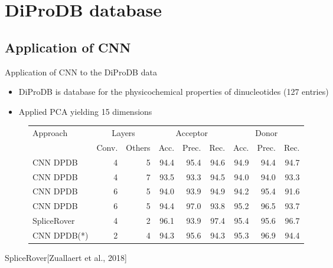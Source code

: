 \documentclass[10pt]{beamer}
\begin{document}
\section{DiProDB database}

\subsection{Application of CNN}
\begin{frame}{Application of CNN to the DiProDB data}
	\begin{itemize}
		\item DiProDB is database for the physicochemical properties of dinucleotides (127 entries)
		\item Applied PCA yielding 15 dimensions
	\end{itemize}
	\pause
	\begin{figure}
		\small
		\centering
		\begingroup
		\def\arraystretch{1.2}
		\begin{tabular}{|l|r|r|r|r|r|r|r|r|}
			\hline
			Approach  & \multicolumn{2}{c}{Layers} & \multicolumn{3}{|c|}{Acceptor} & \multicolumn{3}{c|}{Donor} \\
			\cline{2-9}
			&Conv. & Others & Acc. & Prec. & Rec. & Acc. & Prec. & Rec. \\
			\hline
			CNN DPDB & 4 & 5 & 94.4 & 95.4 & 94.6 & 94.9 & 94.4 & 94.7 \\
			CNN DPDB & 4 & 7 & 93.5 & 93.3 & 94.5 & 94.0 & 94.0 & 93.3 \\
			CNN DPDB & 6 & 5 & 94.0 & 93.9 & 94.9 & 94.2 & 95.4 & 91.6 \\
			CNN DPDB & 6 & 5 & 94.4 & 97.0 & 93.8 & 95.2 & 96.5 & 93.7 \\
			SpliceRover & 4 & 2 & 96.1 & 93.9 & 97.4 & 95.4 & 95.6 & 96.7 \\
			CNN DPDB(*) & 2 & 4 & 94.3 & 95.6 & 94.3 & 95.3 & 96.9 & 94.4 \\
			
			\hline  
		\end{tabular}
		\endgroup
	\end{figure}
	SpliceRover[Zuallaert et al., 2018]
\end{frame}
\end{document}
